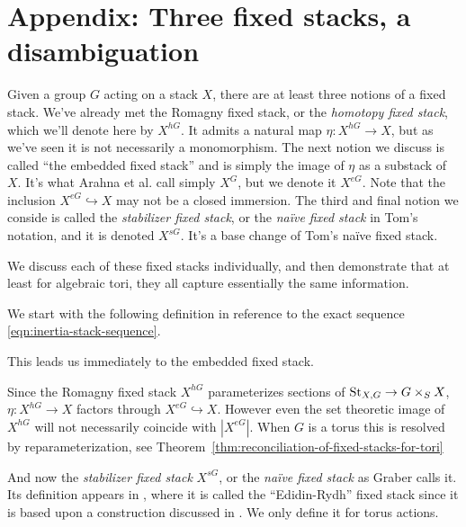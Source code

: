 \section{Appendix: Three fixed stacks, a disambiguation}\label{rl-001A}

Given a group \(G\) acting on a stack \(X\), there are at least three notions of a fixed stack. We've already met the Romagny fixed stack, or the \emph{homotopy fixed stack}, which we'll denote here by \(X^{hG}\). It admits a natural map \(\eta:X^{hG}\to X\), but as we've seen it is not necessarily a monomorphism. The next notion we discuss is called ``the embedded fixed stack'' and is simply the image of $\eta$ as a substack of $X$. It's what Arahna et al. call simply $X^G$, but we denote it \(X^{eG}\). Note that the inclusion \(X^{eG}\hookrightarrow X\) may not be a closed immersion. The third and final notion we conside is called the \textit{stabilizer fixed stack}, or the \textit{na\"ive fixed stack} in Tom's notation, and it is denoted \(X^{sG}\). It's a base change of Tom's na\"ive fixed stack.

We discuss each of these fixed stacks individually, and then demonstrate that at least for algebraic tori, they all capture essentially the same information.

We start with the following definition in reference to the exact sequence \eqref{eqn:inertia-stack-sequence}.


This leads us immediately to the embedded fixed stack.




Since the Romagny fixed stack $X^{hG}$ parameterizes sections of \(\operatorname{St}_{X,G} \to G\times_SX\), \(\eta:X^{hG} \to X\) factors through \(X^{eG}\hookrightarrow X\). However even the set theoretic image of \(X^{hG}\) will not necessarily coincide with \(|X^{eG}|\). When \(G\) is a torus this is resolved by reparameterization, see Theorem~\ref{thm:reconciliation-of-fixed-stacks-for-tori}


And now the \textit{stabilizer fixed stack} \(X^{sG}\), or the \textit{na\"ive fixed stack} as Graber calls it. Its definition appears in \cite{aranha-khan-latyntsev-etal_VirtualLocalizationRevisited2025}, where it is called the ``Edidin-Rydh'' fixed stack since it is based upon a construction discussed in \cite{edidin-rydh_CanonicalReductionStabilizers2021}. We only define it for torus actions.




